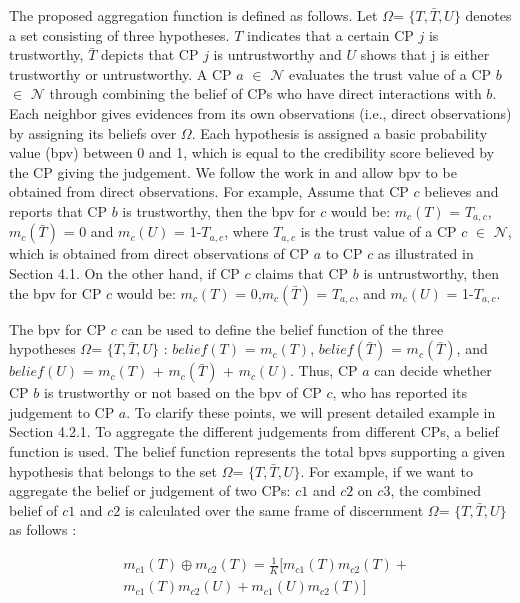 \documentclass[preprint]{elsarticle}
\theoremstyle{definition}
\theoremstyle{remark}
\theoremstyle{property}
\begin{document}
The proposed aggregation function is defined as follows. Let  $\Omega$= $\{T, \bar{T} ,U\}$ denotes
a set consisting of three hypotheses. $T$ indicates that a certain CP $j$ is trustworthy, $\bar{T}$
depicts that CP $j$ is untrustworthy and $U$ shows that j is either trustworthy or untrustworthy.
A CP $a$ $\in$ $\mathcal{N}$ evaluates the trust value of a CP $b$ $\in$ $\mathcal{N}$  through combining the
belief of CPs who have direct interactions with $b$. Each neighbor gives evidences
from its own observations (i.e., direct observations) by assigning its beliefs over $\Omega$. Each hypothesis
is assigned a basic probability value (bpv) between 0 and 1, which is equal
to the credibility score believed by the CP giving the judgement. We follow the work
in \cite{wei2014security} and allow bpv to be obtained from direct observations. For example, Assume
that CP $c$ believes and reports that CP $b$ is trustworthy, then the bpv for $c$ would be:
$m_{c}(T)$ = $T_{a,c}$, $m_{c}(\bar{T})$ = 0 and $m_{c}(U)$ = 1-$T_{a,c}$, where  $T_{a,c}$ is the trust value of a CP $c$ $\in$ $\mathcal{N}$, which is obtained from direct observations of CP $a$ to CP $c$ as illustrated in
Section 4.1. On the other hand, if CP $c$ claims that CP $b$ is untrustworthy, then the
bpv for CP $c$ would be: $m_{c}(T)$ = 0,$m_{c}(\bar{T})$ = $T_{a,c}$, and $m_{c}(U)$ =  1-$T_{a,c}$.

The bpv for CP $c$ can be used to define the belief function of the three hypotheses
$\Omega$= $\{T, \bar{T} ,U\}$ \cite{shafer1992dempster}: $belief(T)$ = $m_{c}(T)$, $belief(\bar{T})$ = $m_{c}(\bar{T})$, and $belief(U)$ = $m_{c}(T)$ + $m_{c}(\bar{T})$ + $m_{c}(U)$. Thus, CP $a$ can decide whether CP $b$ is trustworthy or not based on the bpv of CP $c$, who has reported its judgement to CP $a$. To clarify these points, we will
present detailed example in Section 4.2.1.
To aggregate the different judgements from different CPs, a belief function is used.
The belief function represents the total bpvs supporting a given hypothesis that belongs
to the set $\Omega$= $\{T, \bar{T} ,U\}$. For example, if we want to aggregate the belief or judgement
of two CPs: $c1$ and $c2$ on $c3$, the combined belief of $c1$ and $c2$ is calculated
over the same frame of discernment $\Omega$= $\{T, \bar{T} ,U\}$ as follows \cite{wei2014security}:

\begin{equation}
\begin{aligned}
&m_{c1}(T)\oplus m_{c2}(T) = \frac{1}{K}[m_{c1}(T)m_{c2}(T)+\\
&m_{c1}(T)m_{c2}(U)+m_{c1}(U)m_{c2}(T)] \\
\end{aligned}
\end{equation}
\end{document}
